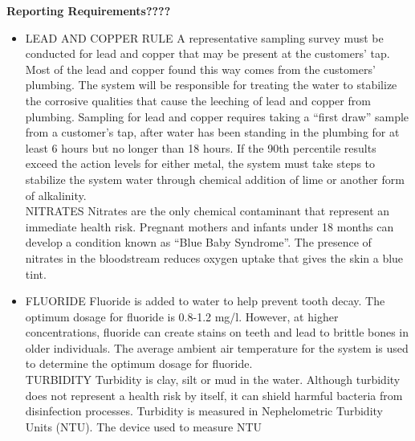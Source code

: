 \documentclass{article}
\begin{document}
\textbf{Reporting Requirements????}\\
\begin{itemize}
\item LEAD AND COPPER RULE A representative sampling survey must be conducted for lead and copper that may be present at the customers’ tap. Most of the lead and copper found this way comes from the customers’ plumbing. The system will be responsible for treating the water to stabilize the corrosive qualities that cause the leeching of lead and copper from plumbing. Sampling for lead and copper requires taking a “first draw” sample from a customer’s tap, after water has been standing in the plumbing for at least 6 hours but no longer than 18 hours. If the 90th percentile results exceed the action levels for either metal, the system must take steps to stabilize the system water through chemical addition of lime or another form of alkalinity.\\
NITRATES Nitrates are the only chemical contaminant that represent an immediate health risk. Pregnant mothers and infants under 18 months can develop a condition known as “Blue Baby Syndrome”. The presence of nitrates in the bloodstream reduces oxygen uptake that gives the skin a blue tint.\\

\item FLUORIDE Fluoride is added to water to help prevent tooth decay. The optimum dosage for fluoride is 0.8-1.2 mg/l. However, at higher concentrations, fluoride can create stains on teeth and lead to brittle bones in older individuals. The average ambient air temperature for the system is used to determine the optimum dosage for fluoride. \\
TURBIDITY Turbidity is clay, silt or mud in the water. Although turbidity does not represent a health risk by itself, it can shield harmful bacteria from disinfection processes. Turbidity is measured in Nephelometric Turbidity Units (NTU). The device used to measure NTU\\


\end{itemize}
\end{document}
